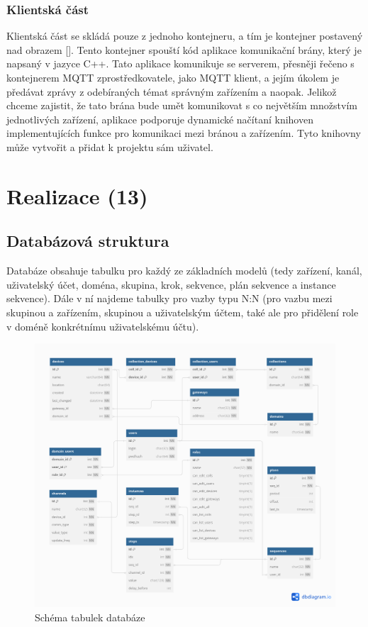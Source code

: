 \subsection{Klientská část}

Klientská část se skládá pouze z jednoho kontejneru, a tím je kontejner postavený nad obrazem []. Tento kontejner spouští kód aplikace komunikační brány, který je napsaný v jazyce C++. Tato aplikace komunikuje se serverem, přesněji řečeno s kontejnerem MQTT zprostředkovatele, jako MQTT klient, a jejím úkolem je předávat zprávy z odebíraných témat správným zařízením a naopak. Jelikož chceme zajistit, že tato brána bude umět komunikovat s co největším množstvím jednotlivých zařízení, aplikace podporuje dynamické načítaní knihoven implementujících funkce pro komunikaci mezi bránou a zařízením. Tyto knihovny může vytvořit a přidat k projektu sám uživatel.

\chapter{Realizace (13)}

\section{Databázová struktura}

Databáze obsahuje tabulku pro každý ze základních modelů (tedy zařízení, kanál, uživatelský účet, doména, skupina, krok, sekvence, plán sekvence a instance sekvence). Dále v ní najdeme tabulky pro vazby typu N:N (pro vazbu mezi skupinou a zařízením, skupinou a uživatelským účtem, také ale pro přidělení role v doméně konkrétnímu uživatelskému účtu).

\begin{figure}[h!]
    \centering
    \includegraphics[width=1\textwidth]{images/database.png}
    \caption[Schéma tabulek databáze]{Schéma tabulek databáze \cite[\nopp Figure 1]{database_schema_generator}}
    \label{fig:my_label}
\end{figure}

